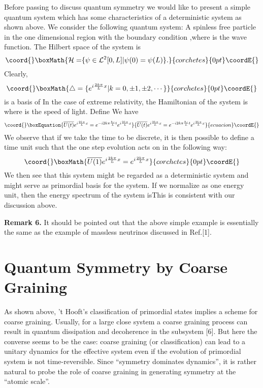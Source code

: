 \documentclass[a4paper,12pt]{article}
\begin{document}
Before passing to discuss quantum symmetry we would like to present a simple
quantum system which has some characteristics of a deterministic system as
shown above. We consider the following quantum system: A spinless free
particle in the one dimensional region \myHighlight{$[0,L]$}\coordHE{} with the boundary condition \coordHE{},where \coordHE{} is the wave function. The Hilbert
space of the system is
\[\coord{}\boxMath{
\mathcal{H=}\{\psi \in \mathcal{L}^2[0,L]|\psi (0)=\psi (L)\}.
}{corchetes}{0pt}\coordE{}\]
Clearly,
\[\coord{}\boxMath{
\triangle =\{e^{i\frac{2k\pi }Lx}|k=0,\pm 1,\pm 2,\cdots \}
}{corchetes}{0pt}\coordE{}\]
is a basis of \coordHE{} In the case of extreme relativity, the
Hamiltonian of the system is \coordHE{}where \coordHE{} is the speed
of light. Define \coordHE{}We have
\begin{equation}\coord{}\boxEquation{
\overline{U(t)}e^{i\frac{2k\pi }Lx}=e^{-i2k\pi \frac{\hbar c}Lt}e^{i\frac{
2k\pi }Lx}
}{
\overline{U(t)}e^{i\frac{2k\pi }Lx}=e^{-i2k\pi \frac{\hbar c}Lt}e^{i\frac{
2k\pi }Lx}
}{ecuacion}\coordE{}\end{equation}
We observe that if we take the time to be discrete, it is then possible to
define a time unit such that the one step evolution acts on \myHighlight{$\triangle $}\coordHE{} in
the following way:
\[\coord{}\boxMath{
\overline{U(1)}e^{i\frac{2k\pi }Lx}=e^{i\frac{2k\pi }Lx}
}{corchetes}{0pt}\coordE{}\]
We then see that this system might be regarded as a deterministic system and
\myHighlight{$\triangle $}\coordHE{} might serve as primordial basis for the system. If we normalize
\coordHE{} as one energy unit, then the energy spectrum of the system
is\coordHE{}This is consistent with our
discussion above.

\textbf{Remark 6.} It should be pointed out that the above simple example is
essentially the same as the example of massless neutrinos discussed in
Ref.[1].

\section{Quantum Symmetry by Coarse Graining}

As shown above, 't Hooft's classification of primordial states implies a
scheme for coarse graining. Usually, for a large close system a coarse
graining process can result in quantum dissipation and decoherence in the
subsystem [6]. But here the converse seems to be the case: coarse graining
(or classification) can lead to a unitary dynamics for the effective system
even if the evolution of primordial system is not time-reversible. Since
``symmetry dominates dynamics'', it is rather natural to probe the role of
coarse graining in generating symmetry at the ``atomic scale''.
\end{document}
